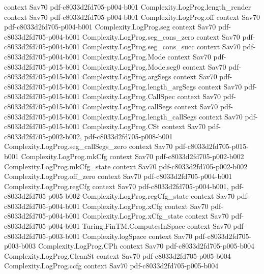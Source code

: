 \begin{theorem}
  {context}
  {Sav70}
  {pdf-c8033d2fd705-p004-b001}
\proofstep
  {Complexity.LogProg.length_render}
  {context}
  {Sav70}
  {pdf-c8033d2fd705-p004-b001}
\proofstep
  {Complexity.LogProg.off}
  {context}
  {Sav70}
  {pdf-c8033d2fd705-p004-b001}
\proofstep
  {Complexity.LogProg.seg}
  {context}
  {Sav70}
  {pdf-c8033d2fd705-p004-b001}
\proofstep
  {Complexity.LogProg.seg_cons_zero}
  {context}
  {Sav70}
  {pdf-c8033d2fd705-p004-b001}
\proofstep
  {Complexity.LogProg.seg_cons_succ}
  {context}
  {Sav70}
  {pdf-c8033d2fd705-p004-b001}
\proofstep
  {Complexity.LogProg.Mode}
  {context}
  {Sav70}
  {pdf-c8033d2fd705-p015-b001}
\proofstep
  {Complexity.LogProg.Mode.seg0}
  {context}
  {Sav70}
  {pdf-c8033d2fd705-p015-b001}
\proofstep
  {Complexity.LogProg.argSegs}
  {context}
  {Sav70}
  {pdf-c8033d2fd705-p015-b001}
\proofstep
  {Complexity.LogProg.length_argSegs}
  {context}
  {Sav70}
  {pdf-c8033d2fd705-p015-b001}
\proofstep
  {Complexity.LogProg.CallSpec}
  {context}
  {Sav70}
  {pdf-c8033d2fd705-p015-b001}
\proofstep
  {Complexity.LogProg.callSegs}
  {context}
  {Sav70}
  {pdf-c8033d2fd705-p015-b001}
\proofstep
  {Complexity.LogProg.length_callSegs}
  {context}
  {Sav70}
  {pdf-c8033d2fd705-p015-b001}
\proofstep
  {Complexity.LogProg.CSt}
  {context}
  {Sav70}
  {pdf-c8033d2fd705-p002-b002,
    pdf-c8033d2fd705-p008-b001}
\proofstep
  {Complexity.LogProg.seg_callSegs_zero}
  {context}
  {Sav70}
  {pdf-c8033d2fd705-p015-b001}
\proofstep
  {Complexity.LogProg.mkCfg}
  {context}
  {Sav70}
  {pdf-c8033d2fd705-p002-b002}
\proofstep
  {Complexity.LogProg.mkCfg_state}
  {context}
  {Sav70}
  {pdf-c8033d2fd705-p002-b002}
\proofstep
  {Complexity.LogProg.off_zero}
  {context}
  {Sav70}
  {pdf-c8033d2fd705-p004-b001}
\proofstep
  {Complexity.LogProg.regCfg}
  {context}
  {Sav70}
  {pdf-c8033d2fd705-p004-b001,
    pdf-c8033d2fd705-p005-b002}
\proofstep
  {Complexity.LogProg.regCfg_state}
  {context}
  {Sav70}
  {pdf-c8033d2fd705-p004-b001}
\proofstep
  {Complexity.LogProg.xCfg}
  {context}
  {Sav70}
  {pdf-c8033d2fd705-p004-b001}
\proofstep
  {Complexity.LogProg.xCfg_state}
  {context}
  {Sav70}
  {pdf-c8033d2fd705-p004-b001}
\proofstep
  {Turing.FinTM.ComputesInSpace}
  {context}
  {Sav70}
  {pdf-c8033d2fd705-p003-b001}
\proofstep
  {Complexity.logSpace}
  {context}
  {Sav70}
  {pdf-c8033d2fd705-p003-b003}
\proofstep
  {Complexity.LogProg.CPh}
  {context}
  {Sav70}
  {pdf-c8033d2fd705-p005-b004}
\proofstep
  {Complexity.LogProg.CleanSt}
  {context}
  {Sav70}
  {pdf-c8033d2fd705-p005-b004}
\proofstep
  {Complexity.LogProg.ccfg}
  {context}
  {Sav70}
  {pdf-c8033d2fd705-p005-b004}

\end{theorem}
